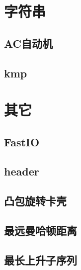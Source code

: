 \documentclass[twocolumn,a4,twoside]{book}
\begin{document}
	
	\chapter{字符串}
		\section{AC自动机}
		
		\section{kmp}
		
		
	\chapter{其它}
		\section{FastIO}
		
		\section{header}
		
		\section{凸包旋转卡壳}
		
		\section{最远曼哈顿距离}
		
		\section{最长上升子序列}
		
\end{document}
